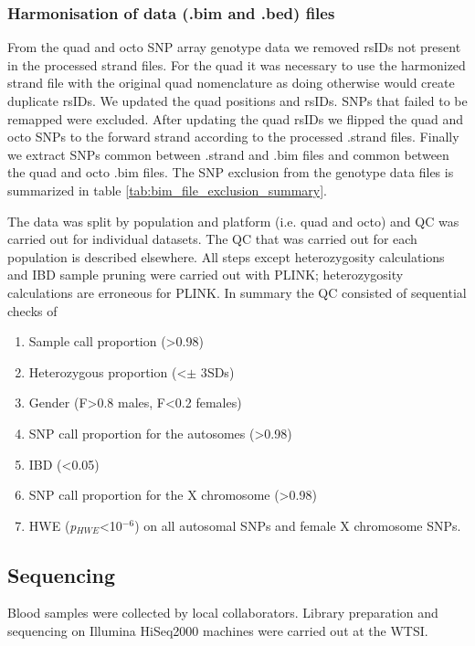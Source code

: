 \subsubsection{Harmonisation of data (.bim and .bed) files}
From the quad and octo \gls{SNP} array genotype data we removed rsIDs not present in the processed strand files. For the quad it was necessary to use the harmonized strand file with the original quad nomenclature as doing otherwise would create duplicate rsIDs. We updated the quad positions and rsIDs. SNPs that failed to be remapped were excluded. After updating the quad rsIDs we flipped the quad and octo \glspl{SNP} to the forward strand according to the processed .strand files. Finally we extract \glspl{SNP} common between .strand and .bim files and common between the quad and octo .bim files. The SNP exclusion from the genotype data files is summarized in table \ref{tab:bim_file_exclusion_summary}.


The data was split by population and platform (i.e. quad and octo) and \gls{QC} was carried out for individual datasets. The \gls{QC} that was carried out for each population is described elsewhere.\cite{Gurdasani2015} All steps except heterozygosity calculations and IBD sample pruning were carried out with PLINK; heterozygosity calculations are erroneous for PLINK. In summary the QC consisted of sequential checks of
\begin{enumerate}
\item Sample call proportion (>0.98)
\item Heterozygous proportion (\textless $\pm$ 3\glspl{SD})
\item Gender (F>0.8 males, F<0.2 females)
\item SNP call proportion for the autosomes (\textgreater0.98)
\item IBD (<0.05)
\item SNP call proportion for the X chromosome (\textgreater0.98)
\item \gls{HWE} (\textit{p}$_{HWE}$<10$^{-6}$) on all autosomal SNPs and female X chromosome SNPs.
\end{enumerate}

\subsection{Sequencing}
Blood samples were collected by local collaborators. Library preparation and sequencing on Illumina HiSeq2000 machines were carried out at the \gls{WTSI}.

